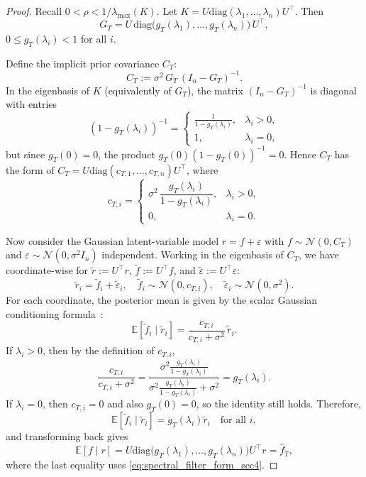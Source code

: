 \documentclass{article}
\theoremstyle{plain}
\theoremstyle{definition}
\theoremstyle{remark}
\begin{document}
\begin{proof}
Recall $0<\rho<1/\lambda_{\max}(K)$. Let $K=U\mathrm{diag}(\lambda_1,\dots,\lambda_n)U^\top$.
Then
\[
G_T
=
U\,\mathrm{diag}\!\bigl(g_T(\lambda_1),\dots,g_T(\lambda_n)\bigr)\,U^\top,
\]
$0\le g_T(\lambda_i)<1$ for all $i$.

Define the implicit prior covariance $C_T$:
\[
C_T := \sigma^2\,G_T\,(I_n-G_T)^{-1}.
\]
In the eigenbasis of $K$ (equivalently of $G_T$), the matrix $(I_n-G_T)^{-1}$ is diagonal with entries
\[
(1-g_T(\lambda_i))^{-1}=
\begin{cases}
\frac{1}{1-g_T(\lambda_i)}, & \lambda_i>0,\\
1, & \lambda_i=0,
\end{cases}
\]
but since $g_T(0)=0$, the product $g_T(0)(1-g_T(0))^{-1}=0$.
Hence $C_T$ has the form of $C_T = U\mathrm{diag}(c_{T,1},\dots,c_{T,n})U^\top$, where
\[
    c_{T,i}=
    \begin{cases} 
        \sigma^2\,\dfrac{g_T(\lambda_i)}{1-g_T(\lambda_i)}, & \lambda_i>0,\\ 
        0, & \lambda_i=0. 
    \end{cases}
\]

Now consider the Gaussian latent-variable model $r=f+\varepsilon$ with
$f\sim\mathcal{N}(0,C_T)$ and $\varepsilon\sim\mathcal{N}(0,\sigma^2 I_n)$ independent.
Working in the eigenbasis of $C_T$, we have coordinate-wise for $\tilde r:=U^\top r$,
$\tilde f:=U^\top f$, and $\tilde\varepsilon:=U^\top\varepsilon$:
\[
\tilde r_i=\tilde f_i+\tilde\varepsilon_i,
\quad
\tilde f_i\sim\mathcal{N}(0,c_{T,i}),
\quad
\tilde\varepsilon_i\sim\mathcal{N}(0,\sigma^2).
\]
For each coordinate, the posterior mean is given by the scalar Gaussian conditioning formula~\citep{RasmussenWilliams2006GPML,Bishop2006PRML}:
\[
\mathbb{E}[\tilde f_i\mid \tilde r_i]
=
\frac{c_{T,i}}{c_{T,i}+\sigma^2}\,\tilde r_i.
\]
If $\lambda_i>0$, then by the definition of $c_{T,i}$,
\[
\frac{c_{T,i}}{c_{T,i}+\sigma^2}
=
\frac{\sigma^2\frac{g_T(\lambda_i)}{1-g_T(\lambda_i)}}{\sigma^2\frac{g_T(\lambda_i)}{1-g_T(\lambda_i)}+\sigma^2}
=
g_T(\lambda_i).
\]
If $\lambda_i=0$, then $c_{T,i}=0$ and also $g_T(0)=0$, so the identity still holds. Therefore,
\[
\mathbb{E}[\tilde f_i\mid \tilde r_i]=g_T(\lambda_i)\tilde r_i
\quad\text{for all } i,
\]
and transforming back gives
\[
\mathbb{E}[f\mid r]
=
U\mathrm{diag}\!\bigl(g_T(\lambda_1),\dots,g_T(\lambda_n)\bigr)U^\top r
=
\hat f_T,
\]
where the last equality uses \eqref{eq:spectral_filter_form_sec4}.
\end{proof}
\end{document}
